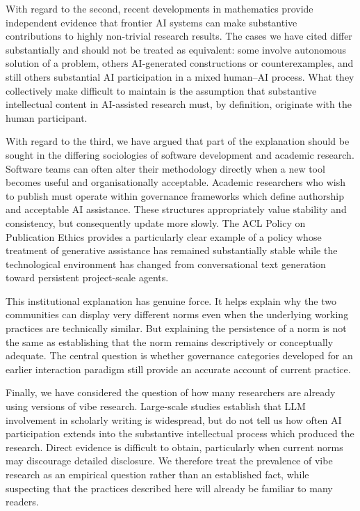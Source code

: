 \documentclass[12pt]{article}
\begin{document}
With regard to the second, recent developments in mathematics provide independent evidence that frontier AI systems can make substantive contributions to highly non-trivial research results. The cases we have cited differ substantially and should not be treated as equivalent: some involve autonomous solution of a problem, others AI-generated constructions or counterexamples, and still others substantial AI participation in a mixed human--AI process. What they collectively make difficult to maintain is the assumption that substantive intellectual content in AI-assisted research must, by definition, originate with the human participant.

With regard to the third, we have argued that part of the explanation should be sought in the differing sociologies of software development and academic research. Software teams can often alter their methodology directly when a new tool becomes useful and organisationally acceptable. Academic researchers who wish to publish must operate within governance frameworks which define authorship and acceptable AI assistance. These structures appropriately value stability and consistency, but consequently update more slowly. The ACL Policy on Publication Ethics provides a particularly clear example of a policy whose treatment of generative assistance has remained substantially stable while the technological environment has changed from conversational text generation toward persistent project-scale agents.

This institutional explanation has genuine force. It helps explain why the two communities can display very different norms even when the underlying working practices are technically similar. But explaining the persistence of a norm is not the same as establishing that the norm remains descriptively or conceptually adequate. The central question is whether governance categories developed for an earlier interaction paradigm still provide an accurate account of current practice.

Finally, we have considered the question of how many researchers are already using versions of vibe research. Large-scale studies establish that LLM involvement in scholarly writing is widespread, but do not tell us how often AI participation extends into the substantive intellectual process which produced the research. Direct evidence is difficult to obtain, particularly when current norms may discourage detailed disclosure. We therefore treat the prevalence of vibe research as an empirical question rather than an established fact, while suspecting that the practices described here will already be familiar to many readers.
\end{document}
